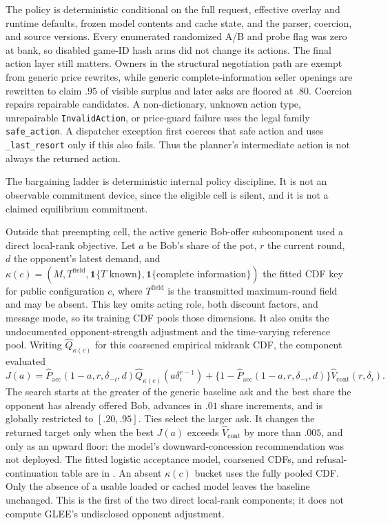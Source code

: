 The policy is deterministic conditional on the full request, effective overlay
and runtime defaults, frozen model contents and cache state, and the parser,
coercion, and source versions. Every enumerated randomized A/B and probe flag
was zero at bank, so disabled game-ID hash arms did not change its actions. The
final action layer still matters. Owners in the structural negotiation path are exempt from generic
price rewrites, while generic complete-information seller openings are
rewritten to claim $.95$ of visible surplus and later asks are floored at
$.80$. Coercion repairs repairable candidates. A non-dictionary, unknown action
type, unrepairable \texttt{InvalidAction}, or price-guard failure uses the legal
family \texttt{safe\_action}. A dispatcher exception first coerces that safe
action and uses \texttt{\_last\_resort} only if this also fails. Thus the
planner's intermediate action is not always the returned action.

The bargaining ladder is deterministic internal policy discipline. It is not
an observable commitment device, since the eligible cell is silent, and it is
not a claimed equilibrium commitment.

Outside that preempting cell, the active generic Bob-offer subcomponent used a
direct local-rank objective. Let $a$ be Bob's share of the pot, $r$ the current
round, $d$ the opponent's latest demand, and
$\kappa(c)=(M,T^{\mathrm{field}},\mathbf 1\{T\text{ known}\},
\mathbf 1\{\text{complete information}\})$ the fitted CDF key for public
configuration $c$, where $T^{\mathrm{field}}$ is the transmitted maximum-round
field and may be absent. This key omits acting role, both discount factors, and
message mode, so its training CDF pools those dimensions. It also omits the
undocumented opponent-strength adjustment and the time-varying reference pool.
Writing $\widehat Q_{\kappa(c)}$ for this coarsened empirical midrank CDF, the
component evaluated
\begin{equation}
J(a)=\widehat P_{\mathrm{acc}}(1-a,r,\delta_{-i},d)
      \widehat Q_{\kappa(c)}(a\delta_i^{r-1})
 +\{1-\widehat P_{\mathrm{acc}}(1-a,r,\delta_{-i},d)\}
      \widehat V_{\mathrm{cont}}(r,\delta_i).
\label{eq:bob_rank_search}
\end{equation}
The search starts at the greater of the generic baseline ask and the best share
the opponent has already offered Bob, advances in $.01$ share increments, and
is globally restricted to $[.20,.95]$. Ties select the larger ask. It changes
the returned target only when the best $J(a)$ exceeds
$\widehat V_{\mathrm{cont}}$ by more than $.005$, and only as an upward floor:
the model's downward-concession recommendation was not deployed. The fitted
logistic acceptance model, coarsened CDFs, and refusal-continuation table are in
. An absent $\kappa(c)$ bucket uses the
fully pooled CDF. Only the absence of a usable loaded or cached model leaves the
baseline unchanged. This is the first of the two direct local-rank components;
it does not compute GLEE's undisclosed opponent adjustment.


